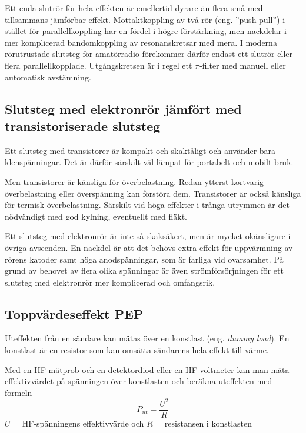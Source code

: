 Ett enda slutrör för hela effekten är emellertid dyrare än flera små med
tillsammans jämförbar effekt.
Mottaktkoppling av två rör (eng. ''push-pull'') i stället för parallellkoppling
har en fördel i högre förstärkning, men nackdelar i mer komplicerad
bandomkoppling av resonanskretsar med mera.
I moderna rörutrustade slutsteg för amatörradio förekommer därför endast ett
slutrör eller flera parallellkopplade.
Utgångskretsen är i regel ett \(\pi \)-filter med manuell eller automatisk
avstämning.

\subsection{Slutsteg med elektronrör jämfört med transistoriserade slutsteg}

Ett slutsteg med transistorer är kompakt och skaktåligt och använder
bara klenspänningar.
Det är därför särskilt väl lämpat för portabelt och mobilt bruk.

Men transistorer är känsliga för överbelastning.
Redan ytterst kortvarig överbelastning eller överspänning kan förstöra dem.
Transistorer är också känsliga för termisk överbelastning.
Särskilt vid höga effekter i trånga utrymmen är det nödvändigt med god kylning,
eventuellt med fläkt.

Ett slutsteg med elektronrör är inte så skaksäkert, men är mycket okänsligare
i övriga avseenden.
En nackdel är att det behövs extra effekt för uppvärmning av rörens katoder
samt höga anodspänningar, som är farliga vid ovarsamhet.
På grund av behovet av flera olika spänningar är även strömförsörjningen för
ett slutsteg med elektronrör mer komplicerad och omfångsrik.

\newpage
\subsection{Toppvärdeseffekt PEP}
\label{PEP-effekt}

Uteffekten från en sändare kan mätas över en konstlast (eng. \emph{dummy load}).
En konstlast är en resistor som kan omsätta sändarens hela effekt till värme.

Med en HF-mätprob och en detektordiod eller en HF-voltmeter kan man mäta
effektivvärdet på spänningen över konstlasten och beräkna uteffekten med
formeln
%
\[P_{ut} = \dfrac{U^2}{R}\]
%
\(U\) = HF-spänningens effektivvärde och 
\(R\) = resistansen i konstlasten

